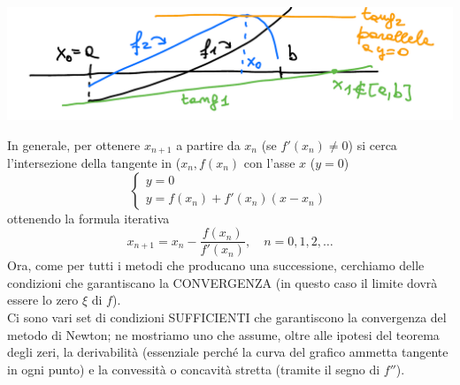 \documentclass[12pt]{article}
\begin{document}
\begin{center}
    \includegraphics[scale=0.5]{pagina7.PNG}
\end{center}
In generale, per ottenere $x_{n+1}$ a partire da $x_n$ (se $f'(x_n)\neq 0$) si cerca l'intersezione della tangente in ($x_n,f(x_n)$ con l'asse $x$ ($y=0$)\\
\[ \begin{cases}
        y=0\\
        y=f(x_n)+f'(x_n)(x-x_n)
\end{cases} \]
ottenendo la formula iterativa\\
\[ x_{n+1}=x_n-\frac{f(x_n)}{f'(x_n)}, \quad n=0,1,2,\dotso \]
Ora, come per tutti i metodi che producano una successione, cerchiamo delle condizioni che garantiscano la CONVERGENZA (in questo caso il limite dovrà essere lo zero $\xi$ di $f$).\\
Ci sono vari set di condizioni SUFFICIENTI che garantiscono la convergenza del metodo di Newton; ne mostriamo uno che assume, oltre alle ipotesi del teorema degli zeri, la derivabilità (essenziale perché la curva del grafico ammetta tangente in ogni punto) e la convessità o concavità stretta (tramite il segno di $f''$).
\end{document}

